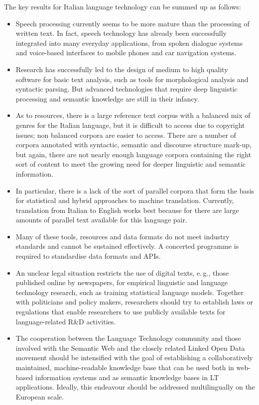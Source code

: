 \begin{multicols}{2}
The key results for Italian language technology can be summed up as follows:

\begin{itemize}
\item Speech processing currently seems to be more mature than the processing of written text. In fact, speech technology has already been successfully integrated into many everyday applications, from spoken dialogue systems and voice-based interfaces to mobile phones and car navigation systems. 
\item Research has successfully led to the design of medium to high quality software for basic text analysis, such as tools for morphological analysis and syntactic parsing. But advanced technologies that require deep linguistic processing and semantic knowledge are still in their infancy. 
\item As to resources, there is a large reference text corpus with a balanced mix of genres for the Italian language, but it is difficult to access due to copyright issues; non balanced corpora are easier to access. There are a number of corpora annotated with syntactic, semantic and discourse structure mark-up, but again, there are not nearly enough language corpora containing the right sort of content to meet the growing need for deeper linguistic and semantic information. 
\item In particular, there is a lack of the sort of parallel corpora that form the basis for statistical and hybrid approaches to machine translation. Currently, translation from Italian to English works best because for there are large amounts of parallel text available for this language pair. 
\item Many of these tools, resources and data formats do not meet industry standards and cannot be sustained effectively. A concerted programme is required to standardise data formats and APIs.
\item An unclear legal situation restricts the use of digital texts, e.\,g., those published online by newspapers, for empirical linguistic and language technology research, such as training statistical language models. Together with politicians and policy makers, researchers should try to establish laws or regulations that enable researchers to use publicly available texts for language-related R\&D activities.
\columnbreak

\item The cooperation between the Language Technology community and those involved with the Semantic Web and the closely related Linked Open Data movement should be intensified with the goal of establishing a collaboratively maintained, machine-readable knowledge base that can be used both in web-based information systems and as semantic knowledge bases in LT applications. Ideally, this endeavour should be addressed multilingually on the European scale.
\end{itemize}


\end{multicols}
